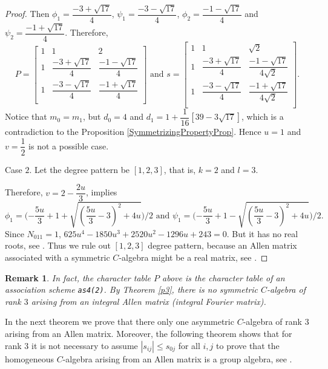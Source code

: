\documentclass[12pt]{amsart}
\newtheorem{remark}[thm]{Remark}
\begin{document}
\begin{proof}
Then $\phi_1=\dfrac{-3+\sqrt{17}}{4}$, $\psi_1=\dfrac{-3-\sqrt{17}}{4}$, $\phi_2=\dfrac{-1-\sqrt{17}}{4}$ and $\psi_2=\dfrac{-1+\sqrt{17}}{4}$.
Therefore,
$$P=\left[
   \begin{array}{ccc}
     1 & 1 & 2 \\
     1 & \dfrac{-3+\sqrt{17}}{4} & \dfrac{-1-\sqrt{17}}{4}\\
     1 & \dfrac{-3-\sqrt{17}}{4} & \dfrac{-1+\sqrt{17}}{4} \\
   \end{array}
 \right]\mbox{ and } s=\left[
   \begin{array}{ccc}
    1 & 1 & \sqrt2 \\
     1 & \dfrac{-3+\sqrt{17}}{4} & \dfrac{-1-\sqrt{17}}{4\sqrt2}\\
     1 & \dfrac{-3-\sqrt{17}}{4} & \dfrac{-1+\sqrt{17}}{4\sqrt2} \\
   \end{array}
 \right].$$
Notice that $m_0=m_1$, but $d_0=4$ and $d_1=1+\dfrac{1}{16}[39-3\sqrt{17}]$, which is a contradiction to the Proposition \ref{SymmetrizingPropertyProp}. Hence $u=1$ and $v=\dfrac12$ is not a possible case.

\medskip

Case $2$. Let the degree pattern be $[1,2,3]$, that is, $k=2$ and $l=3$.

\noindent Therefore, $v=2-\dfrac{2u}3 $, implies
$$\phi_1=\big({-\dfrac{5u}3+1+\sqrt{(\dfrac{5u}3-3)^2+4u}}\big)/{2} \mbox{ and } \psi_1=\big({-\dfrac{5u}3+1-\sqrt{(\dfrac{5u}3-3)^2+4u}}\big)/{2}.$$
Since $N_{011}=1$,
$625u^4-1850u^3+2520u^2-1296u+243=0.$ But it has no real roots, see \cite{EL}.
Thus we rule out $[1,2,3]$ degree pattern, because an Allen matrix associated with a symmetric $C$-algebra might be a real matrix, see \cite[Proposition 21]{G1}.
\end{proof}

\begin{remark}
In fact, the character table $P$ above is the character table of an association scheme {\tt as4(2)}. By Theorem \ref{p3}, there is no  symmetric $C$-algebra of rank $3$ arising from an integral Allen matrix (integral Fourier matrix).
\end{remark}

In the next theorem we prove that there only one asymmetric $C$-algebra of rank 3 arising from an Allen matrix. Moreover, the following theorem shows that for rank $3$ it is not necessary to assume $|s_{ij}|\leq s_{0j}$ for all $i,j$ to prove that the homogeneous $C$-algebra arising from an Allen matrix is a group algebra, see \cite[Theorem 25]{G1}.
\end{document}
